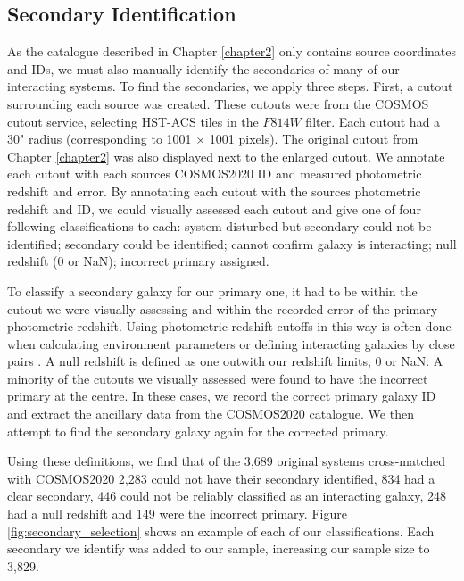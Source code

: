 \subsection{Secondary Identification}\label{sec:sec-ident}
\noindent As the catalogue described in Chapter \ref{chapter2} only contains source coordinates and IDs, we must also manually identify the secondaries of many of our interacting systems. To find the secondaries, we apply three steps. First, a cutout surrounding each source was created. These cutouts were from the COSMOS cutout service, selecting HST-ACS tiles in the $F814W$ filter. Each cutout had a 30" radius (corresponding to 1001 $\times$ 1001 pixels). The original cutout from Chapter \ref{chapter2} was also displayed next to the enlarged cutout. We annotate each cutout with each sources COSMOS2020 ID and measured photometric redshift and error. By annotating each cutout with the sources photometric redshift and ID, we could visually assessed each cutout and give one of four following classifications to each: system disturbed but secondary could not be identified; secondary could be identified; cannot confirm galaxy is interacting; null redshift (0 or NaN); incorrect primary assigned. 

To classify a secondary galaxy for our primary one, it had to be within the cutout we were visually assessing and within the recorded error of the primary photometric redshift. Using photometric redshift cutoffs in this way is often done when calculating environment parameters \citep[e.g][]{2006MNRAS.373..469B} or defining interacting galaxies by close pairs \citep[e.g][]{2022ApJ...940....4S}. A null redshift is defined as one outwith our redshift limits, 0 or NaN. A minority of the cutouts we visually assessed were found to have the incorrect primary at the centre. In these cases, we record the correct primary galaxy ID and extract the ancillary data from the COSMOS2020 catalogue. We then attempt to find the secondary galaxy again for the corrected primary.

Using these definitions, we find that of the 3,689 original systems cross-matched with COSMOS2020 2,283 could not have their secondary identified, 834 had a clear secondary, 446 could not be reliably classified as an interacting galaxy, 248 had a null redshift and 149 were the incorrect primary. Figure \ref{fig:secondary_selection} shows an example of each of our classifications. Each secondary we identify was added to our sample, increasing our sample size to 3,829.

